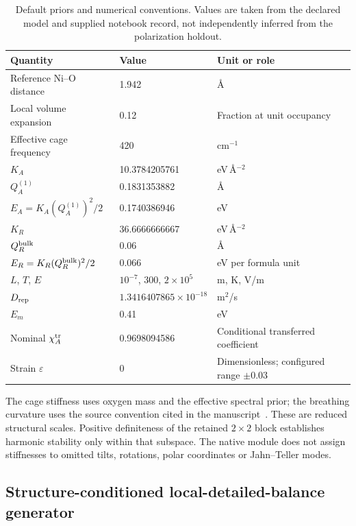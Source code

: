 \documentclass[11pt,a4paper]{article}
\begin{document}
\begin{table}[htbp]
\centering\small
\caption{Default priors and numerical conventions. Values are taken from the declared model and supplied notebook record, not independently inferred from the polarization holdout.}\label{tab:parameters}
\begin{tabular}{@{}lll@{}}\toprule
Quantity & Value & Unit or role\\\midrule
Reference Ni--O distance & 1.942 & \AA\\
Local volume expansion & 0.12 & Fraction at unit occupancy\\
Effective cage frequency & 420 & cm$^{-1}$\\
$K_A$ & 10.3784205761 & eV\,\AA$^{-2}$\\
$Q_A^{(1)}$ & 0.1831353882 & \AA\\
$E_A=K_A(Q_A^{(1)})^2/2$ & 0.1740386946 & eV\\
$K_R$ & 36.6666666667 & eV\,\AA$^{-2}$\\
$Q_R^{\rm bulk}$ & 0.06 & \AA\\
$E_R=K_R(Q_R^{\rm bulk})^2/2$ & 0.066 & eV per formula unit\\
$L$, $T$, $E$ & $10^{-7}$, 300, $2\times10^5$ & m, K, V/m\\
$D_{\rm rep}$ & $1.3416407865\times10^{-18}$ & m$^2$/s\\
$E_m$ & 0.41 & eV\\
Nominal $\chi_A^{\rm tr}$ & 0.9698094586 & Conditional transferred coefficient\\
Strain $\varepsilon$ & 0 & Dimensionless; configured range $\pm0.03$\\
\bottomrule\end{tabular}
\end{table}

The cage stiffness uses oxygen mass and the effective spectral prior; the breathing curvature uses the source convention cited in the manuscript~\cite{lione}. These are reduced structural scales. Positive definiteness of the retained $2\times2$ block establishes harmonic stability only within that subspace. The native module does not assign stiffnesses to omitted tilts, rotations, polar coordinates or Jahn--Teller modes.

\subsection{Structure-conditioned local-detailed-balance generator}
\end{document}
